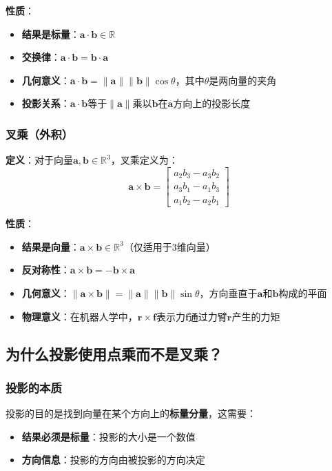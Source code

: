 \documentclass[12pt,a4paper]{article}
\begin{document}
\textbf{性质}：
\begin{itemize}
\item \textbf{结果是标量}：$\bm{a} \cdot \bm{b} \in \mathbb{R}$
\item \textbf{交换律}：$\bm{a} \cdot \bm{b} = \bm{b} \cdot \bm{a}$
\item \textbf{几何意义}：$\bm{a} \cdot \bm{b} = \|\bm{a}\| \|\bm{b}\| \cos \theta$，其中$\theta$是两向量的夹角
\item \textbf{投影关系}：$\bm{a} \cdot \bm{b}$等于$\|\bm{a}\|$乘以$\bm{b}$在$\bm{a}$方向上的投影长度
\end{itemize}

\subsubsection{叉乘（外积）}

\textbf{定义}：对于向量$\bm{a}, \bm{b} \in \mathbb{R}^3$，叉乘定义为：
\begin{equation}
\bm{a} \times \bm{b} = \begin{bmatrix}
a_2 b_3 - a_3 b_2 \\
a_3 b_1 - a_1 b_3 \\
a_1 b_2 - a_2 b_1
\end{bmatrix}
\end{equation}

\textbf{性质}：
\begin{itemize}
\item \textbf{结果是向量}：$\bm{a} \times \bm{b} \in \mathbb{R}^3$（仅适用于3维向量）
\item \textbf{反对称性}：$\bm{a} \times \bm{b} = -\bm{b} \times \bm{a}$
\item \textbf{几何意义}：$\|\bm{a} \times \bm{b}\| = \|\bm{a}\| \|\bm{b}\| \sin \theta$，方向垂直于$\bm{a}$和$\bm{b}$构成的平面
\item \textbf{物理意义}：在机器人学中，$\bm{r} \times \bm{f}$表示力$\bm{f}$通过力臂$\bm{r}$产生的力矩
\end{itemize}

\subsection{为什么投影使用点乘而不是叉乘？}

\subsubsection{投影的本质}

投影的目的是找到向量在某个方向上的\textbf{标量分量}，这需要：
\begin{itemize}
\item \textbf{结果必须是标量}：投影的大小是一个数值
\item \textbf{方向信息}：投影的方向由被投影的方向决定
\end{itemize}
\end{document}
